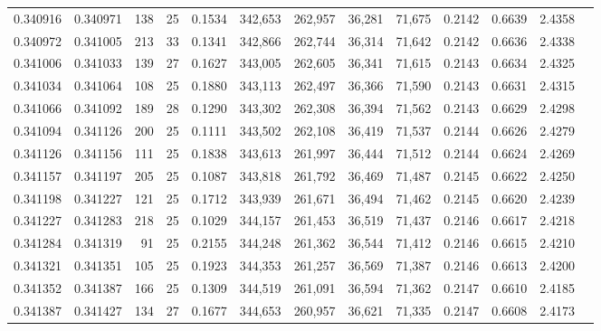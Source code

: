 \begin{tabular}{rrrrrrrrrrrrr}
0.340916 & 0.340971 &   138 &  25 &                                     0.1534 & 342,653 & 262,957 &  36,281 &  71,675 & 0.2142 & 0.6639 & 2.4358 \\
0.340972 & 0.341005 &   213 &  33 &                                     0.1341 & 342,866 & 262,744 &  36,314 &  71,642 & 0.2142 & 0.6636 & 2.4338 \\
0.341006 & 0.341033 &   139 &  27 &                                     0.1627 & 343,005 & 262,605 &  36,341 &  71,615 & 0.2143 & 0.6634 & 2.4325 \\
0.341034 & 0.341064 &   108 &  25 &                                     0.1880 & 343,113 & 262,497 &  36,366 &  71,590 & 0.2143 & 0.6631 & 2.4315 \\
0.341066 & 0.341092 &   189 &  28 &                                     0.1290 & 343,302 & 262,308 &  36,394 &  71,562 & 0.2143 & 0.6629 & 2.4298 \\
0.341094 & 0.341126 &   200 &  25 &                                     0.1111 & 343,502 & 262,108 &  36,419 &  71,537 & 0.2144 & 0.6626 & 2.4279 \\
0.341126 & 0.341156 &   111 &  25 &                                     0.1838 & 343,613 & 261,997 &  36,444 &  71,512 & 0.2144 & 0.6624 & 2.4269 \\
0.341157 & 0.341197 &   205 &  25 &                                     0.1087 & 343,818 & 261,792 &  36,469 &  71,487 & 0.2145 & 0.6622 & 2.4250 \\
0.341198 & 0.341227 &   121 &  25 &                                     0.1712 & 343,939 & 261,671 &  36,494 &  71,462 & 0.2145 & 0.6620 & 2.4239 \\
0.341227 & 0.341283 &   218 &  25 &                                     0.1029 & 344,157 & 261,453 &  36,519 &  71,437 & 0.2146 & 0.6617 & 2.4218 \\
0.341284 & 0.341319 &    91 &  25 &                                     0.2155 & 344,248 & 261,362 &  36,544 &  71,412 & 0.2146 & 0.6615 & 2.4210 \\
0.341321 & 0.341351 &   105 &  25 &                                     0.1923 & 344,353 & 261,257 &  36,569 &  71,387 & 0.2146 & 0.6613 & 2.4200 \\
0.341352 & 0.341387 &   166 &  25 &                                     0.1309 & 344,519 & 261,091 &  36,594 &  71,362 & 0.2147 & 0.6610 & 2.4185 \\
0.341387 & 0.341427 &   134 &  27 &                                     0.1677 & 344,653 & 260,957 &  36,621 &  71,335 & 0.2147 & 0.6608 & 2.4173 \\

\end{tabular}
